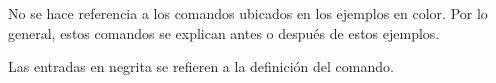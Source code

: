 No se hace referencia a los comandos ubicados en los ejemplos en color. Por lo general, estos comandos se explican antes o después de estos ejemplos.

Las entradas en negrita se refieren a la definición del comando. 
